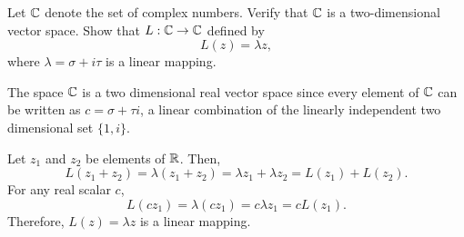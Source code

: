 \documentclass{ximera}
\begin{document}
\begin{exercise} \label{c7.2.3}
Let $\mbox{$\mathbb{C}$}$ denote the set of complex numbers.  Verify that
$\mbox{$\mathbb{C}$}$ is a two-dimensional vector space.  Show that $L:\mbox{$\mathbb{C}$}\to\mbox{$\mathbb{C}$}$
defined by
\[
L(z) = \lambda z,
\]
where $\lambda=\sigma+i\tau$ is a linear mapping.

\begin{solution}

\soln
The space $\mbox{$\mathbb{C}$}$ is a two dimensional real vector space since every
element of $\mbox{$\mathbb{C}$}$ can be written as $c = \sigma + \tau i$, a linear
combination of the linearly independent two dimensional set $\{1,i\}$.

\para Let $z_1$ and $z_2$ be elements of $\mbox{$\mathbb{R}$}$.  Then,
\[ L(z_1 + z_2) = \lambda(z_1 + z_2) =
\lambda z_1 + \lambda z_2 = L(z_1) + L(z_2). \]
For any real scalar $c$,
\[ L(cz_1) = \lambda(cz_1) = 
c\lambda z_1 = cL(z_1). \]
Therefore, $L(z) = \lambda z$ is a linear mapping.


\end{solution}
\end{exercise}
\end{document}

